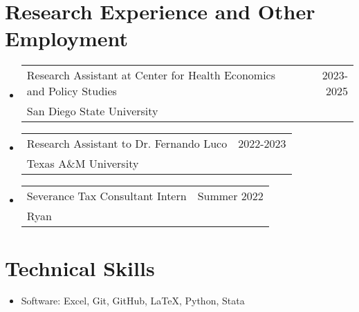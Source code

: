 \documentclass[letterpaper,11pt]{article}
\makeatletter
\newcommand{\resumeSubheading}[4]{
  \vspace{-2pt}
    \item
    \begin{tabular*}{0.97\textwidth}[t]{l@{\extracolsep{\fill}}r}
      #1 & #2 \\
      \hspace{0.15in}#3 & {#4} \\
    \end{tabular*}\vspace{-7pt}
}
\newcommand{\resumeSubHeadingListStart}{\begin{itemize}[leftmargin=0.15in, label={}]}
\newcommand{\resumeSubHeadingListEnd}{\end{itemize}}
\makeatother
\begin{document}
\section{Research Experience and Other Employment}
    \resumeSubHeadingListStart
      \resumeSubheading{Research Assistant at Center for 
      Health Economics and Policy Studies}{2023-2025}
      {San Diego State University}{}

      \resumeSubheading{Research Assistant to Dr. Fernando Luco}{2022-2023}
      {Texas A\&M University}{}

      \resumeSubheading{Severance Tax Consultant Intern}{Summer 2022}{Ryan}{}
    \resumeSubHeadingListEnd

%
\section{Technical Skills}

 \begin{itemize}[leftmargin=0.15in, label={}]
    \item{
     Software{: Excel, Git, GitHub, \LaTeX, Python, Stata} \\
    }
 \end{itemize}
\end{document}
